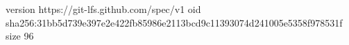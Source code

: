 version https://git-lfs.github.com/spec/v1
oid sha256:31bb5d739e397e2e422fb85986e2113bcd9c11393074d241005e5358f978531f
size 96
